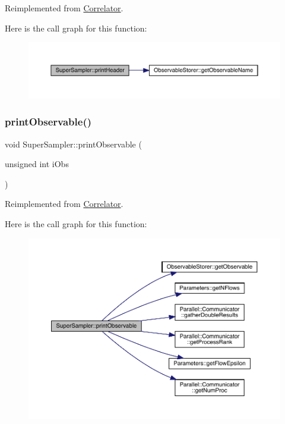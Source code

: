 Reimplemented from \mbox{\hyperlink{class_correlator_ac7c5a07d7cbee97c417a1659b93083b2}{Correlator}}.

Here is the call graph for this function\+:\nopagebreak
\begin{figure}[H]
\begin{center}
\leavevmode
\includegraphics[width=350pt]{class_super_sampler_a9bedfcc40a22c48378a6ed63f64e6957_cgraph}
\end{center}
\end{figure}
\mbox{\label{class_super_sampler_adf92b9281ee9a782e6c00424dd23451d}} 
\subsubsection{\texorpdfstring{printObservable()}{printObservable()}}
{\footnotesize\ttfamily void Super\+Sampler\+::print\+Observable (\begin{DoxyParamCaption}\item[{unsigned int}]{i\+Obs }\end{DoxyParamCaption})\hspace{0.3cm}{\ttfamily [virtual]}}



Reimplemented from \mbox{\hyperlink{class_correlator_a15744ddb9f2b71fff34ac762d101df38}{Correlator}}.

Here is the call graph for this function\+:\nopagebreak
\begin{figure}[H]
\begin{center}
\leavevmode
\includegraphics[width=350pt]{class_super_sampler_adf92b9281ee9a782e6c00424dd23451d_cgraph}
\end{center}
\end{figure}
\mbox{\label{class_super_sampler_a04b230314ae446c77172c97ff52cf4f3}} 
